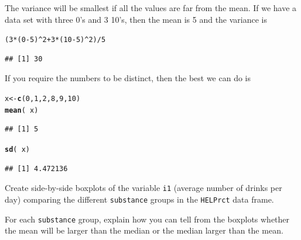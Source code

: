 \documentclass[twoside]{book}\usepackage[]{graphicx}\usepackage[]{xcolor}
\makeatletter
\newcommand{\hlnum}[1]{\textcolor[rgb]{0.686,0.059,0.569}{#1}}%
\newcommand{\hlopt}[1]{\textcolor[rgb]{0,0,0}{#1}}%
\newcommand{\hlstd}[1]{\textcolor[rgb]{0.345,0.345,0.345}{#1}}%
\newcommand{\hlkwb}[1]{\textcolor[rgb]{0.69,0.353,0.396}{#1}}%
\newcommand{\hlkwd}[1]{\textcolor[rgb]{0.737,0.353,0.396}{\textbf{#1}}}%
\newenvironment{kframe}{%
 \def\at@end@of@kframe{}%
 \ifinner\ifhmode%
  \def\at@end@of@kframe{\end{minipage}}%
  \begin{minipage}{\columnwidth}%
 \fi\fi%
 \def\FrameCommand##1{\hskip\@totalleftmargin \hskip-\fboxsep
 \colorbox{shadecolor}{##1}\hskip-\fboxsep
     \hskip-\linewidth \hskip-\@totalleftmargin \hskip\columnwidth}%
 \MakeFramed {\advance\hsize-\width
   \@totalleftmargin\z@ \linewidth\hsize
   \@setminipage}}%
 {\par\unskip\endMakeFramed%
 \at@end@of@kframe}
\newenvironment{knitrout}{}{} %
\newcommand{\variable}[1]{{\color{green!50!black}\texttt{#1}}}
\newcommand{\Rindex}[1]{\index{\texttt{#1}}}
\newcommand{\dataframe}[1]{{\color{blue!80!black}\texttt{#1}}\Rindex{#1}}
\makeatother
\begin{document}
\begin{solution}
	The variance will be smallest if all the values are far from the mean.
	If we have a data set with three 0's and 3 10's, then the mean is 5 and the 
	variance is
\begin{knitrout}
\color{fgcolor}\begin{kframe}
\begin{alltt}
\hlstd{(}\hlnum{3} \hlopt{*} \hlstd{(}\hlnum{0} \hlopt{-} \hlnum{5}\hlstd{)}\hlopt{^}\hlnum{2} \hlopt{+} \hlnum{3} \hlopt{*} \hlstd{(}\hlnum{10} \hlopt{-} \hlnum{5}\hlstd{)}\hlopt{^}\hlnum{2}\hlstd{)}\hlopt{/}\hlnum{5}
\end{alltt}
\begin{verbatim}
## [1] 30
\end{verbatim}
\end{kframe}
\end{knitrout}
	If you require the numbers to be distinct, then the best we can do is
\begin{knitrout}
\color{fgcolor}\begin{kframe}
\begin{alltt}
\hlstd{x} \hlkwb{<-} \hlkwd{c}\hlstd{(}\hlnum{0}\hlstd{,} \hlnum{1}\hlstd{,} \hlnum{2}\hlstd{,} \hlnum{8}\hlstd{,} \hlnum{9}\hlstd{,} \hlnum{10}\hlstd{)}
\hlkwd{mean}\hlstd{(}\hlopt{~}\hlstd{x)}
\end{alltt}
\begin{verbatim}
## [1] 5
\end{verbatim}
\begin{alltt}
\hlkwd{sd}\hlstd{(}\hlopt{~}\hlstd{x)}
\end{alltt}
\begin{verbatim}
## [1] 4.472136
\end{verbatim}
\end{kframe}
\end{knitrout}
\end{solution}

\begin{problem}
	Create side-by-side boxplots of the variable \variable{i1} (average number of
	drinks per day) comparing the different \variable{substance} groups
	in the \dataframe{HELPrct} data frame.

	For each \variable{substance} group, explain how you can tell from the 
	boxplots whether the mean will be larger than the median or the median 
	larger than the mean.
\end{problem}
\end{document}
